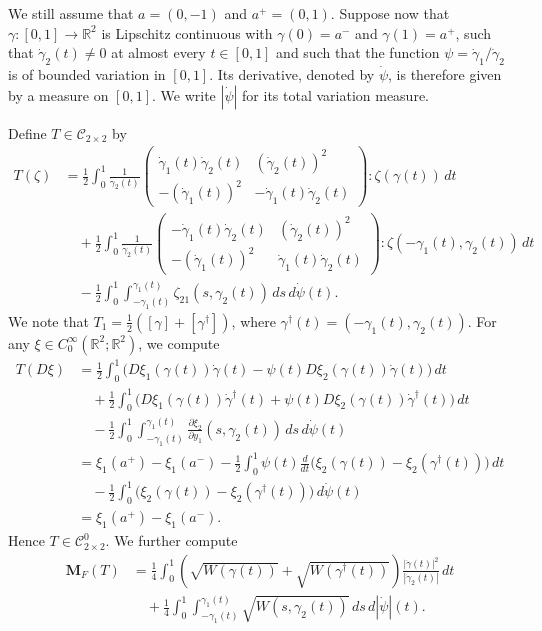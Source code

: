\documentclass[a4paper]{article}
\newcommand{\R}{\mathbb{R}}
\newcommand{\M}{\mathbf{M}}
\newcommand{\ncrt}{\mathcal{C}}
\newcommand{\dd}[2]{\frac{\partial #1}{\partial #2}}
\theoremstyle{definition}
\theoremstyle{remark}
\begin{document}
We still assume that $a = (0, -1)$ and $a^+ = (0, 1)$.
Suppose now that $\gamma \colon [0, 1] \to \R^2$ is Lipschitz continuous with $\gamma(0) = a^-$ and
$\gamma(1) = a^+$, such that $\dot{\gamma}_2(t) \neq 0$ at almost every $t \in [0, 1]$ and such that
the function $\psi = \dot{\gamma}_1/\dot{\gamma}_2$ is of bounded variation in $[0, 1]$.
Its derivative, denoted by $\dot{\psi}$, is therefore given by a measure on $[0, 1]$.
We write $|\dot{\psi}|$ for its total variation measure.

Define $T \in \ncrt_{2 \times 2}$ by
\[
\begin{split}
T(\zeta) & = \frac{1}{2} \int_0^1 \frac{1}{\dot{\gamma}_2(t)} \begin{pmatrix} \dot{\gamma}_1(t) \dot{\gamma}_2(t) & (\dot{\gamma}_2(t))^2 \\ - (\dot{\gamma}_1(t))^2 & - \dot{\gamma}_1(t) \dot{\gamma}_2(t) \end{pmatrix} : \zeta(\gamma(t)) \, dt \\
& \quad + \frac{1}{2} \int_0^1 \frac{1}{\dot{\gamma}_2(t)} \begin{pmatrix} -\dot{\gamma}_1(t) \dot{\gamma}_2(t) & (\dot{\gamma}_2(t))^2 \\ -(\dot{\gamma}_1(t))^2 & \dot{\gamma}_1(t) \dot{\gamma}_2(t) \end{pmatrix} : \zeta(-\gamma_1(t), \gamma_2(t)) \, dt \\
& \quad - \frac{1}{2} \int_0^1 \int_{- \gamma_1(t)}^{\gamma_1(t)} \zeta_{21}(s, \gamma_2(t)) \, ds \, d\dot{\psi}(t).
\end{split}
\]
We note that $T_1 = \frac{1}{2}([\gamma] + [\gamma^\dagger])$, where $\gamma^\dagger(t) = (-\gamma_1(t), \gamma_2(t))$.
For any $\xi \in C_0^\infty(\R^2; \R^2)$, we compute
\[
\begin{split}
T(D\xi) & = \frac{1}{2} \int_0^1 \bigl(D\xi_1(\gamma(t)) \dot{\gamma}(t) - \psi(t) D\xi_2(\gamma(t)) \dot{\gamma}(t)\bigr) \, dt \\
& \quad + \frac{1}{2} \int_0^1 \bigl(D\xi_1(\gamma(t)) \dot{\gamma}^\dagger(t) + \psi(t) D\xi_2(\gamma(t)) \dot{\gamma}^\dagger(t)\bigr) \, dt \\
& \quad - \frac{1}{2} \int_0^1 \int_{-\gamma_1(t)}^{\gamma_1(t)} \dd{\xi_2}{y_1}(s, \gamma_2(t)) \, ds \, d\dot{\psi}(t) \\
& = \xi_1(a^+) - \xi_1(a^-) - \frac{1}{2} \int_0^1 \psi(t) \frac{d}{dt}\bigl(\xi_2(\gamma(t)) - \xi_2(\gamma^\dagger(t))\bigr) \, dt \\
& \quad - \frac{1}{2} \int_0^1 \bigl(\xi_2(\gamma(t)) - \xi_2(\gamma^\dagger(t))\bigr) \, d\dot{\psi}(t) \\
& = \xi_1(a^+) - \xi_1(a^-).
\end{split}
\]
Hence $T \in \ncrt_{2 \times 2}^0$. We further compute
\[
\begin{split}
\M_F(T) & = \frac{1}{4} \int_0^1 \left(\sqrt{W(\gamma(t))} + \sqrt{W(\gamma^\dagger(t))}\right) \frac{|\dot{\gamma}(t)|^2}{|\dot{\gamma}_2(t)|} \, dt \\
& \quad + \frac{1}{4} \int_0^1 \int_{-\gamma_1(t)}^{\gamma_1(t)} \sqrt{W(s, \gamma_2(t))} \, ds \, d|\dot{\psi}|(t).
\end{split}
\]
\end{document}
